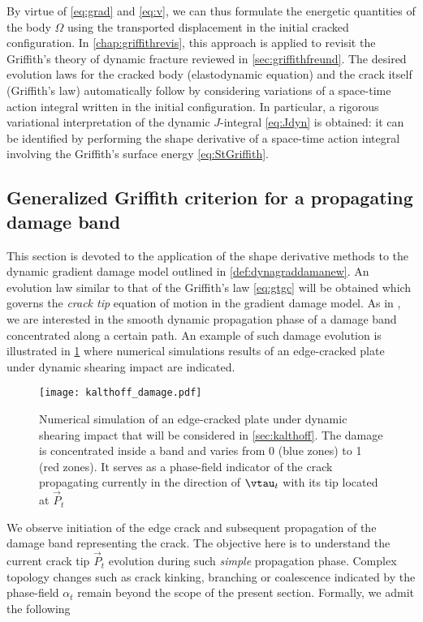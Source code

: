 By virtue of \eqref{eq:grad} and \eqref{eq:v}, we can thus formulate the energetic quantities of the body $\Omega$ using the transported displacement in the initial cracked configuration. In \cref{chap:griffithrevis}, this approach is applied to revisit the Griffith's theory of dynamic fracture reviewed in \cref{sec:griffithfreund}. The desired evolution laws for the cracked body (elastodynamic equation) and the crack itself (Griffith's law) automatically follow by considering variations of a space-time action integral written in the initial configuration. In particular, a rigorous variational interpretation of the dynamic $J$-integral \eqref{eq:Jdyn} is obtained: it can be identified by performing the shape derivative of a space-time action integral involving the Griffith's surface energy \eqref{eq:StGriffith}.

\subsection{Generalized Griffith criterion for a propagating damage band}
This section is devoted to the application of the shape derivative methods to the dynamic gradient damage model outlined in \cref{def:dynagraddamanew}. An evolution law similar to that of the Griffith's law \eqref{eq:gtgc} will be obtained which governs the \emph{crack tip} equation of motion in the gradient damage model. As in \cite{SicsicMarigo:2013}, we are interested in the smooth dynamic propagation phase of a damage band concentrated along a certain path. An example of such damage evolution is illustrated in \cref{fig:kalthoffF} where numerical simulations results of an edge-cracked plate under dynamic shearing impact are indicated.
\begin{figure}[htbp]
\centering
\texttt{[image: kalthoff\_damage.pdf]}
\caption{Numerical simulation of an edge-cracked plate under dynamic shearing impact that will be considered in \cref{sec:kalthoff}. The damage is concentrated inside a band and varies from 0 (blue zones) to 1 (red zones). It serves as a phase-field indicator of the crack propagating currently in the direction of $\vtau_t$ with its tip located at $\vec{P}_t$} \label{fig:kalthoffF}
\end{figure}
We observe initiation of the edge crack and subsequent propagation of the damage band representing the crack. The objective here is to understand the current crack tip $\vec{P}_t$ evolution during such \emph{simple} propagation phase. Complex topology changes such as crack kinking, branching or coalescence indicated by the phase-field $\alpha_t$ remain beyond the scope of the present section. Formally, we admit the following
